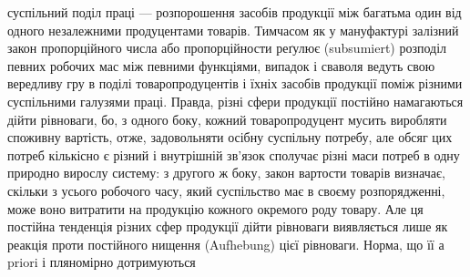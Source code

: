 суспільний поділ праці — розпорошення засобів продукції
між багатьма один від одного незалежними продуцентами товарів.
Тимчасом як у мануфактурі залізний закон пропорційного числа
або пропорційности реґулює (subsumiert) розподіл певних робочих
мас між певними функціями, випадок і сваволя ведуть свою
вередливу гру в поділі товаропродуцентів і їхніх засобів продукції
поміж різними суспільними галузями праці. Правда, різні сфери
продукції постійно намагаються дійти рівноваги, бо, з одного
боку, кожний товаропродуцент мусить виробляти споживну вартість,
отже, задовольняти осібну суспільну потребу, але обсяг
цих потреб кількісно є різний і внутрішній зв’язок сполучає
різні маси потреб в одну природно вирослу систему: з другого ж
боку, закон вартости товарів визначає, скільки з усього робочого
часу, який суспільство має в своєму розпорядженні, може воно
витратити на продукцію кожного окремого роду товару. Але ця
постійна тенденція різних сфер продукції дійти рівноваги виявляється
лише як реакція проти постійного нищення (Aufhebung)
цієї рівноваги. Норма, що її а priori і пляномірно дотримуються
\parbreak{}  %
